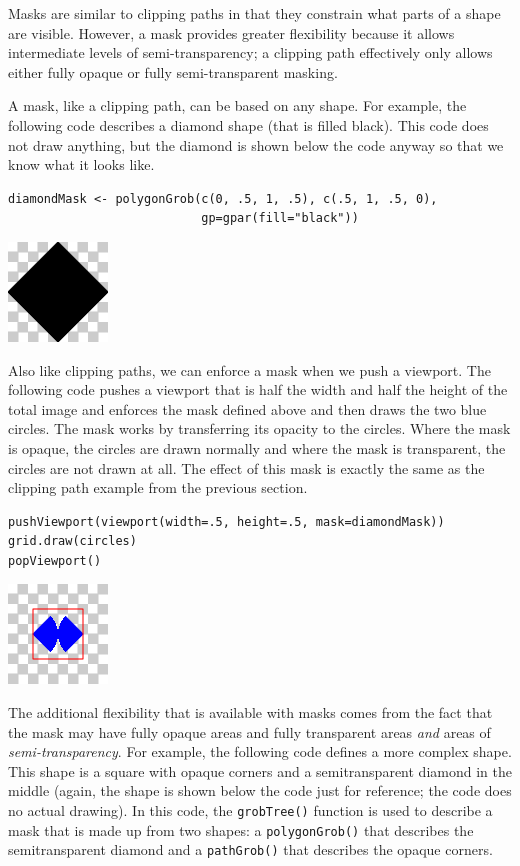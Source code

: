 Masks are similar to clipping paths in that they constrain what parts
of a shape are visible. However, a mask provides greater flexibility
because it allows intermediate levels of semi-transparency;
a clipping path effectively only allows either fully opaque or
fully semi-transparent masking.

A mask, like a clipping path, can be based on any shape.
For example, the following code describes a diamond shape
(that is filled black).
This code does not draw anything, but the diamond is shown below
the code anyway so that we know what it looks like.

\begin{verbatim}
diamondMask <- polygonGrob(c(0, .5, 1, .5), c(.5, 1, .5, 0),
                           gp=gpar(fill="black"))
\end{verbatim}

\includegraphics{murrell-definitions-2023_files/figure-latex/unnamed-chunk-19-1.png}

Also like clipping paths, we can enforce a mask when we push a viewport.
The following code pushes a viewport that is half the width and half the height
of the total image
and enforces the mask defined above and then draws the two blue circles.
The mask works by transferring its opacity to the circles.
Where the mask is opaque, the circles are drawn normally and
where the mask is transparent, the circles are not drawn at all.
The effect of this mask is exactly the same as the clipping path
example from the previous section.

\begin{verbatim}
pushViewport(viewport(width=.5, height=.5, mask=diamondMask))
grid.draw(circles)
popViewport()
\end{verbatim}

\includegraphics{murrell-definitions-2023_files/figure-latex/unnamed-chunk-20-1.png}

The additional flexibility that is available with masks comes from
the fact that the mask may have fully opaque areas and fully
transparent areas \emph{and} areas of \emph{semi-transparency}.
For example, the following code defines a more complex shape.
This shape is a square with opaque corners and a semitransparent
diamond in the middle (again, the shape is shown below the code
just for reference; the code does no actual drawing).
In this code, the \texttt{grobTree()} function is used to describe a mask
that is made up from two shapes:
a \texttt{polygonGrob()} that describes the semitransparent diamond and
a \texttt{pathGrob()} that describes the opaque corners.

